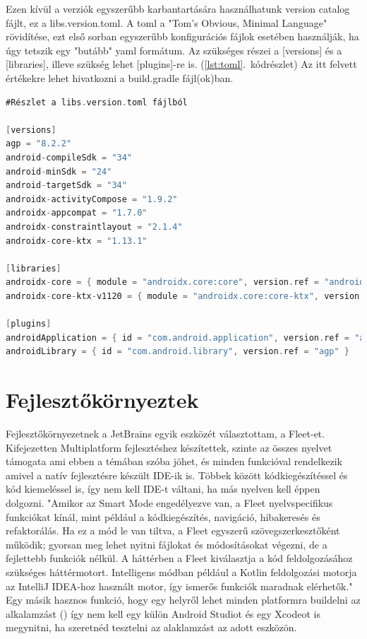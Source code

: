 Ezen kívül a verziók egyszerűbb karbantartására használhatunk version catalog fájlt, ez a libs.version.toml.
A toml a "Tom's Obvious, Minimal Language" rövidítése, ezt első sorban egyszerűbb konfigurációs fájlok esetében használják, ha úgy tetszik egy "butább" yaml formátum.
Az szükséges részei a [versions] és a [libraries], illeve szükség lehet [plugins]-re is. (\ref{lst:toml}.~kódrészlet) Az itt felvett értékekre lehet hivatkozni a build.gradle fájl(ok)ban.

\begin{lstlisting}[caption={Version catalog}, label={lst:toml}, language=Kotlin]
#Részlet a libs.version.toml fájlból

[versions]
agp = "8.2.2"
android-compileSdk = "34"
android-minSdk = "24"
android-targetSdk = "34"
androidx-activityCompose = "1.9.2"
androidx-appcompat = "1.7.0"
androidx-constraintlayout = "2.1.4"
androidx-core-ktx = "1.13.1"

[libraries]
androidx-core = { module = "androidx.core:core", version.ref = "androidx-core-ktx" }
androidx-core-ktx-v1120 = { module = "androidx.core:core-ktx", version.ref = "coreKtx" }

[plugins]
androidApplication = { id = "com.android.application", version.ref = "agp" }
androidLibrary = { id = "com.android.library", version.ref = "agp" }
\end{lstlisting}


\section{Fejlesztőkörnyeztek}

Fejlesztőkörnyezetnek a JetBrains egyik eszközét választottam, a Fleet-et.
Kifejezetten Multiplatform fejlesztéshez készítettek, szinte az összes nyelvet támogata ami ebben a témában szóba jöhet, és minden funkcióval rendelkezik amivel a natív fejlesztésre készült IDE-ik is.
Többek között kódkiegészítéssel és kód kiemeléssel is, így nem kell IDE-t váltani, ha más nyelven kell éppen dolgozni.
"Amikor az Smart Mode engedélyezve van, a Fleet nyelvspecifikus funkciókat kínál, mint például a kódkiegészítés, navigáció, hibakeresés és refaktorálás. Ha ez a mód le van tiltva, a Fleet egyszerű szövegszerkesztőként működik; gyorsan meg lehet nyitni fájlokat és módosításokat végezni, de a fejlettebb funkciók nélkül. A háttérben a Fleet kiválasztja a kód feldolgozásához szükséges háttérmotort. Intelligens módban például a Kotlin feldolgozási motorja az IntelliJ IDEA-hoz használt motor, így ismerős funkciók maradnak elérhetők." \cite{Fleet}
Egy másik hasznos funkció, hogy egy helyről lehet minden platformra buildelni az alkalamzást () így nem kell egy külön Android Studiot és egy Xcodeot is megynitni, ha szeretnéd tesztelni az alaklamzást az adott eszközön.

